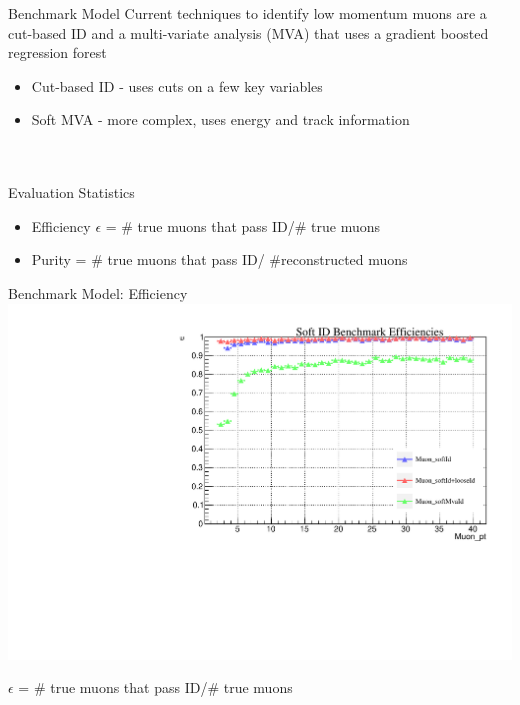 \documentclass[10pt,handout]{beamer}
\begin{document}
\begin{frame}{Benchmark Model}
Current techniques to identify low momentum muons are a cut-based ID and a multi-variate analysis (MVA) that uses a gradient boosted regression forest
\quad \\
\begin{itemize}
\item Cut-based ID - uses cuts on a few key variables
\item Soft MVA - more complex, uses energy and track information
\end{itemize}
\quad \\
\quad \\
Evaluation Statistics
\begin{itemize}
\item Efficiency $\epsilon$ = \# true muons that pass ID/\# true muons
\item Purity = \# true muons that pass ID/ \#reconstructed muons
\end{itemize}
\end{frame}




\begin{frame}{Benchmark Model: Efficiency}
\centering
\includegraphics[scale=.5]{benchmarkEfficiency_TTjets.pdf}

$\epsilon$ = \# true muons that pass ID/\# true muons
\end{frame}
\end{document}
